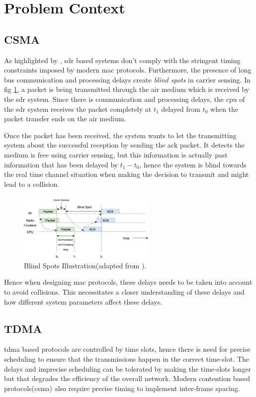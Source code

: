 \section{Problem Context}

\subsection{CSMA}
As highlighted by \cite{schmid_experimental_2007}, \ac{sdr} based systems don't comply with the stringent timing constraints imposed by modern \ac{mac} protocols. Furthermore, the presence of long bus communication and processing delays create \textit{blind spots}\cite{schmid_experimental_2007} in carrier sensing. In fig \ref{blind_spots}, a packet is being transmitted through the air medium which is received by the \ac{sdr} system. Since there is communication and processing delays, the \ac{cpu} of the \ac{sdr} system  receives the packet completely at $t_1$ delayed from $t_0$ when the packet transfer ends on the air medium.

Once the packet has been received, the system wants to let the transmitting system about the successful reception by sending the \ac{ack} packet. It detects the medium is free using carrier sensing, but this information is actually past information that has been delayed by $t_1 - t_0$, hence the system is blind towards the real time channel situation when making the decision to transmit and might lead to a collision. \\ 

\begin{figure}[!h]
\centering
\includegraphics[width=0.6\textwidth]{Figure/BlindSpots.png}
\caption{Blind Spots Illustration(adapted from \cite{schmid_experimental_2007}).}
\label{blind_spots}
\end{figure}

Hence when designing \ac{mac} protocols, these delays needs to be taken into account to avoid collisions. This necessitates a closer understanding of these delays and how different system parameters affect these delays.

\subsection{TDMA}
\ac{tdma} based protocols are controlled by time slots, hence there is need for precise scheduling to ensure that the transmissions happen in the correct time-slot. The delays and imprecise scheduling can be tolerated by making the time-slots longer but that degrades the efficiency of the overall network. Modern contention based protocols(\ac{csma}) also require precise timing to implement inter-frame spacing.\\

